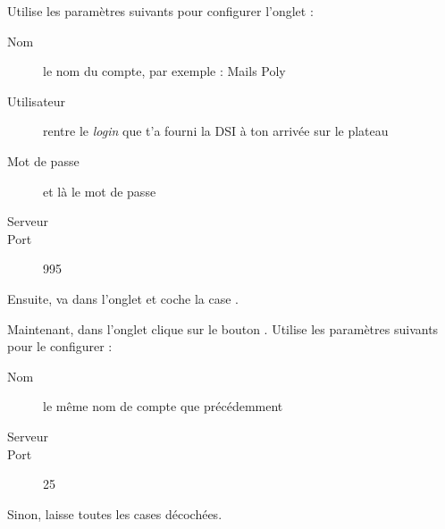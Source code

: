 Utilise les paramètres suivants pour configurer l'onglet  :
\begin{description}
  \item[Nom] le nom du compte, par exemple : Mails Poly
  \item[Utilisateur] rentre le \emph{login}  que t'a fourni la DSI à ton arrivée sur le plateau
  \item[Mot de passe] et là le mot de passe 
  \item[Serveur] 
  \item[Port] 995
\end{description}
Ensuite, va dans l'onglet  et coche la case
.

Maintenant, dans l'onglet  clique sur le
bouton . Utilise les paramètres suivants pour le
configurer :
\begin{description}
  \item[Nom] le m\^eme nom de compte que précédemment
  \item[Serveur] 
  \item[Port] 25
\end{description}
Sinon, laisse toutes les cases décochées.

